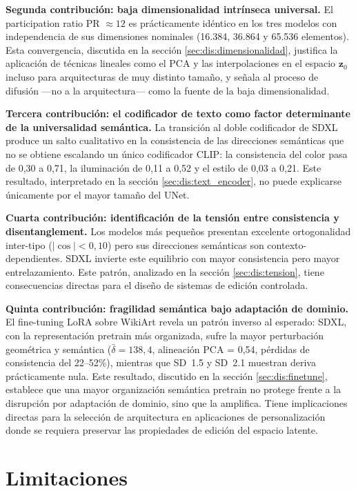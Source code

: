 \documentclass[12pt, a4paper, twoside]{book}
\newcommand{\z}{\mathbf{z}}
\begin{document}
\textbf{Segunda contribución: baja dimensionalidad intrínseca universal.} El participation ratio PR $\approx 12$ es prácticamente idéntico en los tres modelos con independencia de sus dimensiones nominales (16.384, 36.864 y 65.536 elementos). Esta convergencia, discutida en la sección \ref{sec:dis:dimensionalidad}, justifica la aplicación de técnicas lineales como el PCA y las interpolaciones en el espacio $\z_0$ incluso para arquitecturas de muy distinto tamaño, y señala al proceso de difusión ---no a la arquitectura--- como la fuente de la baja dimensionalidad.

\textbf{Tercera contribución: el codificador de texto como factor determinante de la universalidad semántica.} La transición al doble codificador de SDXL produce un salto cualitativo en la consistencia de las direcciones semánticas que no se obtiene escalando un único codificador CLIP: la consistencia del color pasa de 0,30 a 0,71, la iluminación de 0,11 a 0,52 y el estilo de 0,03 a 0,21. Este resultado, interpretado en la sección \ref{sec:dis:text_encoder}, no puede explicarse únicamente por el mayor tamaño del UNet.

\textbf{Cuarta contribución: identificación de la tensión entre consistencia y disentanglement.} Los modelos más pequeños presentan excelente ortogonalidad inter-tipo ($|\cos| < 0{,}10$) pero sus direcciones semánticas son contexto-dependientes. SDXL invierte este equilibrio con mayor consistencia pero mayor entrelazamiento. Este patrón, analizado en la sección \ref{sec:dis:tension}, tiene consecuencias directas para el diseño de sistemas de edición controlada.

\textbf{Quinta contribución: fragilidad semántica bajo adaptación de dominio.} El fine-tuning LoRA sobre WikiArt revela un patrón inverso al esperado: SDXL, con la representación pretrain más organizada, sufre la mayor perturbación geométrica y semántica ($\bar{\delta} = 138{,}4$, alineación PCA = 0,54, pérdidas de consistencia del 22--52\%), mientras que SD~1.5 y SD~2.1 muestran deriva prácticamente nula. Este resultado, discutido en la sección \ref{sec:dis:finetune}, establece que una mayor organización semántica pretrain no protege frente a la disrupción por adaptación de dominio, sino que la amplifica. Tiene implicaciones directas para la selección de arquitectura en aplicaciones de personalización donde se requiera preservar las propiedades de edición del espacio latente.

\section{Limitaciones}
\label{sec:concl:limitaciones}
\end{document}
